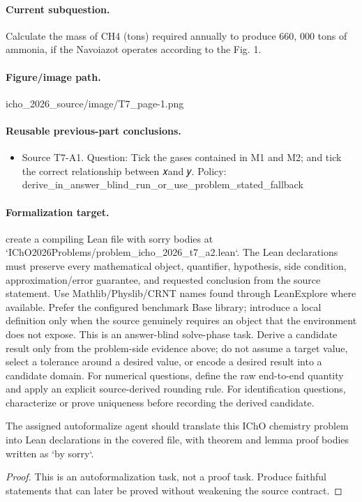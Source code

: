 \paragraph{Current subquestion.}
Calculate the mass of CH4 (tons) required annually to produce 660, 000 tons of ammonia, if the Navoiazot operates according to the Fig. 1.

\paragraph{Figure/image path.}
icho\_2026\_source/image/T7\_page-1.png

\paragraph{Reusable previous-part conclusions.}
\begin{itemize}
\item Source T7-A1. Question: Tick the gases contained in M1 and M2; and tick the correct relationship between 𝑥and 𝑦. Policy: derive\_in\_answer\_blind\_run\_or\_use\_problem\_stated\_fallback
\end{itemize}

\paragraph{Formalization target.}
create a compiling Lean file with sorry bodies at `IChO2026Problems/problem\_icho\_2026\_t7\_a2.lean`.
The Lean declarations must preserve every mathematical object, quantifier, hypothesis, side condition, approximation/error guarantee, and requested conclusion from the source statement.
Use Mathlib/Physlib/CRNT names found through LeanExplore where available. Prefer the configured benchmark Base library; introduce a local definition only when the source genuinely requires an object that the environment does not expose.
This is an answer-blind solve-phase task. Derive a candidate result only from the problem-side evidence above; do not assume a target value, select a tolerance around a desired value, or encode a desired result into a candidate domain.
For numerical questions, define the raw end-to-end quantity and apply an explicit source-derived rounding rule. For identification questions, characterize or prove uniqueness before recording the derived candidate.

\begin{theorem}
\label{thm:physics:icho_2026_t7_a2:target}
The assigned autoformalize agent should translate this IChO chemistry problem into Lean declarations in the covered file, with theorem and lemma proof bodies written as `by sorry`.
\end{theorem}
\begin{proof}
This is an autoformalization task, not a proof task. Produce faithful statements that can later be proved without weakening the source contract.
\end{proof}
